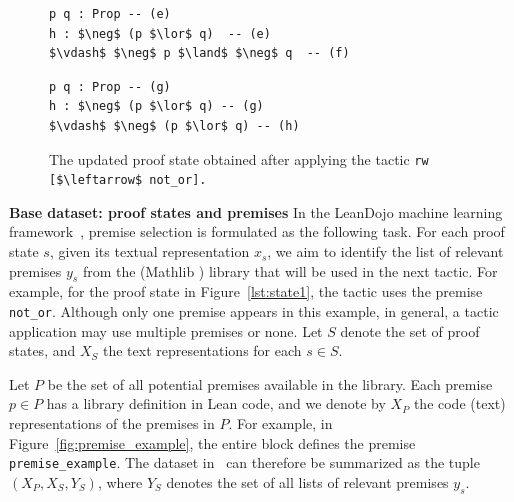 \begin{figure}[h]
    \centering
    \begin{minipage}[t]{0.45\textwidth} %
        \begin{lstlisting}
p q : Prop -- (e)
h : $\neg$ (p $\lor$ q)  -- (e)
$\vdash$ $\neg$ p $\land$ $\neg$ q  -- (f)
\end{lstlisting}

        \caption{Initial proof state immediately after \texttt{by}. \textit{State nodes} are created for proof states. The initial state after \texttt{by} (in Figure~\ref{lst:state1}) is linked to its local hypotheses (\texttt{[Or, Not]}) and goal premises (\texttt{[And, Not]}).} 
        \label{lst:state1}
    \end{minipage}
    \hfill
    \begin{minipage}[t]{0.45\textwidth} %
        \begin{lstlisting}
p q : Prop -- (g)
h : $\neg$ (p $\lor$ q) -- (g)
$\vdash$ $\neg$ (p $\lor$ q) -- (h)
\end{lstlisting}
        \caption{The updated proof state obtained after applying the tactic \protect\lstinline[language=lean]|rw [$\leftarrow$ not_or].|}
        \label{lst:state2}
    \end{minipage}
\end{figure}

\textbf{Base dataset: proof states and premises}  
In the LeanDojo machine learning framework~\citep{yang2023leandojo}, premise selection is formulated as the following task. For each proof state $s$, given its textual representation $x_s$, we aim to identify the list of relevant premises $y_s$ from the (Mathlib \citep{mathlib}) library that will be used in the next tactic. For example, for the proof state in Figure~\ref{lst:state1}, the tactic uses the premise \texttt{not\_or}. Although only one premise appears in this example, in general, a tactic application may use multiple premises or none. Let $S$ denote the set of proof states, and $X_S$ the text representations for each $s \in S$.
  
Let $P$ be the set of all potential premises available in the library. Each premise $p \in P$ has a library definition in Lean code, and we denote by $X_P$ the code (text) representations of the premises in $P$. For example, in Figure~\ref{fig:premise_example}, the entire block defines the premise \texttt{premise\_example}. The dataset in~\citep{yang2023leandojo} can therefore be summarized as the tuple $(X_P, X_S, Y_S)$, where $Y_S$ denotes the set of all lists of relevant premises $y_s$.

